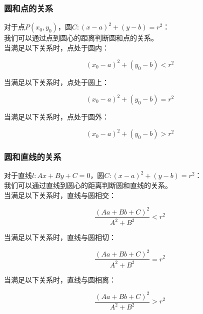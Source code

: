 \documentclass[UTF8]{ctexart}
\begin{document}
\subsubsection{圆和点的关系}
    对于点$P(x_0,y_0)$，圆$C:(x-a)^2+(y-b)=r^2$：\\[3mm]
    我们可以通过点到圆心的距离判断圆和点的关系。\\[5mm]
    当满足以下关系时，点处于圆内：
    \begin{large}
        \begin{equation*}
            (x_0-a)^2+(y_0-b)<r^2
        \end{equation*}
    \end{large}
    \vspace{5pt}
    当满足以下关系时，点处于圆上：
    \begin{large}
        \begin{equation*}
            (x_0-a)^2+(y_0-b)=r^2
        \end{equation*}
    \end{large}
    \vspace{5pt}
    当满足以下关系时，点处于圆外：
    \begin{large}
        \begin{equation*}
            (x_0-a)^2+(y_0-b)>r^2
        \end{equation*}
    \end{large}

\subsubsection{圆和直线的关系}
    对于直线$l:Ax+By+C=0$，圆$C:(x-a)^2+(y-b)=r^2$：\\[3mm]
    我们可以通过直线到圆心的距离判断圆和直线的关系。\\[5mm]
    当满足以下关系时，直线与圆相交：
    \begin{large}
        \begin{equation*}
            \frac{\left(Aa+Bb+C\right)^2}{A^2+B^2}<r^2
        \end{equation*}
    \end{large}
    \vspace{5pt}
    当满足以下关系时，直线与圆相切：
    \begin{large}
        \begin{equation*}
            \frac{\left(Aa+Bb+C\right)^2}{A^2+B^2}=r^2
        \end{equation*}
    \end{large}
    \vspace{5pt}
    当满足以下关系时，直线与圆相离：
    \begin{large}
        \begin{equation*}
            \frac{\left(Aa+Bb+C\right)^2}{A^2+B^2}>r^2
        \end{equation*}
    \end{large}
\end{document}
